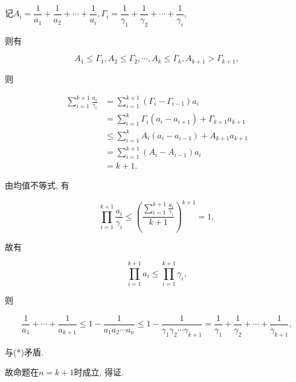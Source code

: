 \documentclass[8pt]{article}
\begin{document}
\begin{enumerate}
			记$A_i = \dfrac{1}{a_1} + \dfrac{1}{a_2} + \cdots + \dfrac{1}{a_i}, \Gamma_i = \dfrac{1}{\gamma_1} + \dfrac{1}{\gamma_2} + \cdots + \dfrac{1}{\gamma_i},$

			则有

			$$A_1 \leq \Gamma_1, A_2 \leq \Gamma_2, \cdots, A_k \leq \Gamma_k, A_{k+1} > \Gamma_{k+1},$$

			则

			\begin{align*}
				\sum_{i=1}^{k+1} \frac{a_i}{\gamma_i} &= \sum_{i=1}^{k+1} \left(\Gamma_i - \Gamma_{i-1}\right) a_i\\
				&= \sum_{i=1}^{k} \Gamma_i (a_i - a_{i+1}) + \Gamma_{k+1} a_{k+1}\\
				&\leq \sum_{i=1}^{k} A_i (a_i - a_{i-1}) + A_{k+1} a_{k+1}\\
				&= \sum_{i=1}^{k+1} (A_i - A_{i-1})a_i\\
				&= k+1.
			\end{align*}

			由均值不等式, 有

			$$\prod_{i=1}^{k+1} \frac{a_i}{\gamma_i} \leq \left(\frac{\sum_{i=1}^{k+1} \frac{a_i}{\gamma_i}}{k+1}\right)^{k+1}=1,$$

			故有

			$$\prod_{i=1}^{k+1} a_i \leq \prod_{i=1}^{k+1} \gamma_i,$$

			则

			$$\frac{1}{a_1} + \cdots + \frac{1}{a_{k+1}} \leq 1-\frac{1}{a_1 a_2 \cdots a_n} \leq 1 - \frac{1}{\gamma_1 \gamma_2 \cdots \gamma_{k+1}} = \frac{1}{\gamma_1} + \frac{1}{\gamma_2} + \cdots + \frac{1}{\gamma_{k+1}},$$

			与(*)矛盾.

			故命题在$n=k+1$时成立, 得证.

	\end{enumerate}
\end{document}
